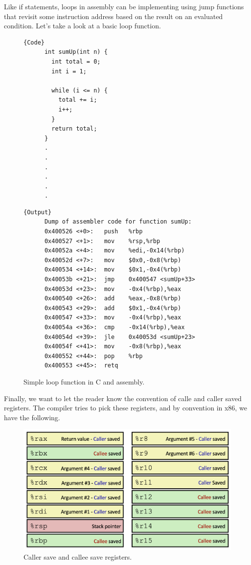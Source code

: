 \documentclass{article}
\begin{document}
  Like if statements, loops in assembly can be implementing using jump functions that revisit some instruction address based on the result on an evaluated condition. Let's take a look at a basic loop function. 

  \begin{figure}[H]
    \centering 
    \noindent\begin{minipage}{.5\textwidth}
    \begin{lstlisting}[]{Code}
      int sumUp(int n) {
        int total = 0;
        int i = 1;

        while (i <= n) {  
          total += i;   
          i++; 
        }
        return total;
      }
      .
      .
      .
      .
      .
      .
    \end{lstlisting}
    \end{minipage}
    \hfill
    \begin{minipage}{.49\textwidth}
    \begin{lstlisting}[]{Output}
      Dump of assembler code for function sumUp:
      0x400526 <+0>:   push   %rbp
      0x400527 <+1>:   mov    %rsp,%rbp
      0x40052a <+4>:   mov    %edi,-0x14(%rbp)
      0x40052d <+7>:   mov    $0x0,-0x8(%rbp)
      0x400534 <+14>:  mov    $0x1,-0x4(%rbp)
      0x40053b <+21>:  jmp    0x400547 <sumUp+33>
      0x40053d <+23>:  mov    -0x4(%rbp),%eax
      0x400540 <+26>:  add    %eax,-0x8(%rbp)
      0x400543 <+29>:  add    $0x1,-0x4(%rbp)
      0x400547 <+33>:  mov    -0x4(%rbp),%eax
      0x40054a <+36>:  cmp    -0x14(%rbp),%eax
      0x40054d <+39>:  jle    0x40053d <sumUp+23>
      0x40054f <+41>:  mov    -0x8(%rbp),%eax
      0x400552 <+44>:  pop    %rbp
      0x400553 <+45>:  retq
    \end{lstlisting}
    \end{minipage}
    \caption{Simple loop function in C and assembly. } 
    \label{fig:loop_function}
  \end{figure}

  Finally, we want to let the reader know the convention of calle and caller saved registers. The compiler tries to pick these registers, and by convention in x86, we have the following. 

  \begin{figure}[H]
    \centering 
    \includegraphics[scale=0.4]{img/caller_callee_save.png}
    \caption{Caller save and callee save registers. } 
    \label{fig:caller_callee_save}
  \end{figure}
\end{document}
